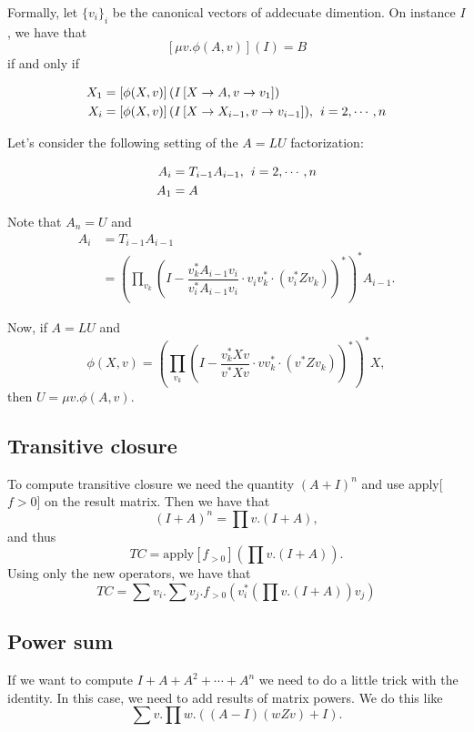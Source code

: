 Formally, let $\lbrace v_i\rbrace_i$ be the canonical vectors of addecuate dimention. On instance $I$, we have that $$\left[\mu v. \phi(A,v)\right](I)=B$$ if and only if

\begin{align*}
X_1&=\left[\phi(X,v)\right](I\left[X\rightarrow A, v\rightarrow v_1\right]) \\
X_i&=\left[\phi(X, v)\right](I\left[X\rightarrow X_{i-1}, v\rightarrow v_{i-1}\right]),\hspace{1ex}i=2,\cdots, n
\end{align*}

Let's consider the following setting of the $A=LU$ factorization:

\begin{align*}
A_i&=T_{i-1}A_{i-1},\hspace{1ex}i=2, \cdots, n \\
A_1&=A \\
\end{align*}

Note that $A_n=U$ and 
\begin{align*}
A_i&=T_{i-1}A_{i-1} \\
&=\left(\prod_{v_k}\left(I-\dfrac{v_k^*A_{i-1}v_i}{v_i^*A_{i-1}v_i}\cdot v_iv_k^*\cdot\left(v_i^*Zv_k\right)\right)^*\right)^*A_{i-1}.
\end{align*}

Now, if $A=LU$ and $$\phi(X, v)=\left(\prod_{v_k}\left(I-\dfrac{v_k^*Xv}{v^*Xv}\cdot vv_k^*\cdot\left(v^*Zv_k\right)\right)^*\right)^*X,$$
then $U=\mu v.\phi(A,v)$.

\subsection*{Transitive closure}

To compute transitive closure we need the quantity $(A+I)^n$ and use apply[$f>0$] on the result matrix. Then we have that $$(I+A)^n=\prod v. (I+A),$$ and thus $$TC = \text{apply}\left[ f_{>0}\right]\left( \prod v. (I+A) \right).$$
Using only the new operators, we have that $$TC=\sum v_i. \sum v_j. f_{>0}\left(v_i^*\left(\prod v. (I+A)\right)v_j\right)$$

\subsection*{Power sum}

If we want to compute $I+ A + A^2 + \cdots + A^n$ we need to do a little trick with the identity. In this case, we need to add results of matrix powers. We do this like $$\sum v.\prod w. \left( (A-I)(wZv) + I\right).$$

